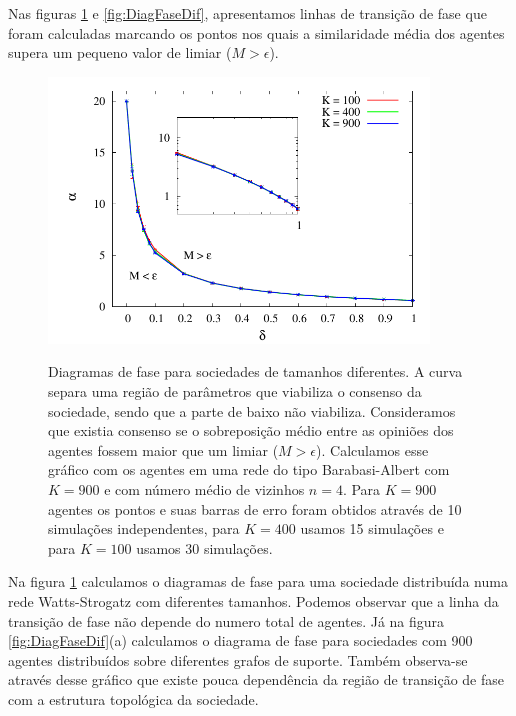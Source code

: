 Nas figuras \ref{fig:DiagFase} e \ref{fig:DiagFaseDif}, apresentamos
linhas de transição de fase que foram calculadas marcando os pontos nos quais a
similaridade média dos agentes supera um pequeno valor de limiar ($M>\epsilon$).

\begin{figure}
\centering
\caption{ 
    Diagramas de fase para sociedades de tamanhos diferentes. A curva separa
    uma região de parâmetros que viabiliza o consenso da sociedade, sendo
    que a parte de baixo não viabiliza. Consideramos que existia consenso
    se o sobreposição médio entre as opiniões dos agentes fossem maior que um
    limiar ($M > \epsilon $).  Calculamos esse gráfico com os agentes em
    uma rede do tipo Barabasi-Albert com $K=900$ e com número médio de
    vizinhos $n=4$. Para $K =900$ agentes os pontos e suas barras de erro
    foram obtidos através de 10 simulações independentes, para $K=400$ usamos
    15 simulações e para $K=100$ usamos 30 simulações. 
    }
\includegraphics[width=0.9\textwidth]{Figures/Diag_AgentAgent_Barabasi_Dif_NUM_Nviz4}
\label{fig:DiagFase}
\end{figure}

Na figura \ref{fig:DiagFase} calculamos o diagramas de fase para uma sociedade
distribuída numa rede Watts-Strogatz com diferentes tamanhos. Podemos
observar que a linha da transição de fase não depende do numero total
de agentes. Já na figura \ref{fig:DiagFaseDif}(a) calculamos o diagrama de
fase para sociedades com 900 agentes distribuídos sobre diferentes grafos
de suporte. Também observa-se através desse gráfico que existe pouca
dependência da região de transição de fase com a estrutura topológica
da sociedade. 

